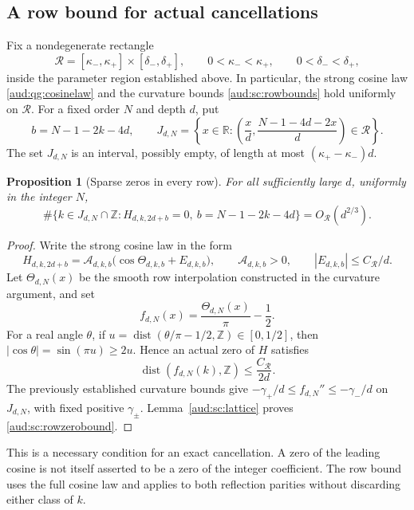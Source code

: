 \documentclass[11pt,a4paper]{article}
\numberwithin{equation}{section}
\newtheorem{proposition}[theorem]{Proposition}
\begin{document}
\subsection{A row bound for actual cancellations}\label{aud:sc:rows}
Fix a nondegenerate rectangle
\[
 \mathcal R=[\kappa_-,\kappa_+]\times[\delta_-,\delta_+],
 \qquad 0<\kappa_-<\kappa_+,
 \qquad 0<\delta_-<\delta_+,
\]
inside the parameter region established above.  In particular, the strong
cosine law \eqref{aud:qg:cosinelaw} and the curvature bounds
\eqref{aud:sc:rowbounds} hold uniformly on $\mathcal R$.
For a fixed order $N$ and depth $d$, put
\[
 b=N-1-2k-4d,
 \qquad
 J_{d,N}=\left\{x\in\mathbb R:
 \left(\frac{x}{d},\frac{N-1-4d-2x}{d}\right)\in\mathcal R\right\}.
\]
The set $J_{d,N}$ is an interval, possibly empty, of length at most
$(\kappa_+-\kappa_-)d$.

\begin{proposition}[Sparse zeros in every row]\label{aud:sc:rowzeros}
For all sufficiently large $d$, uniformly in the integer $N$,
\begin{equation}\label{aud:sc:rowzerobound}
 \#\{k\in J_{d,N}\cap\mathbb Z:
          H_{d,k,2d+b}=0,\ b=N-1-2k-4d\}
 =O_{\mathcal R}(d^{2/3}).
\end{equation}
\end{proposition}
\begin{proof}
Write the strong cosine law in the form
\[
 H_{d,k,2d+b}
 =\mathcal A_{d,k,b}\bigl(\cos\Theta_{d,k,b}+E_{d,k,b}\bigr),
 \qquad \mathcal A_{d,k,b}>0,
 \qquad |E_{d,k,b}|\le C_{\mathcal R}/d.
\]
Let $\Theta_{d,N}(x)$ be the smooth row interpolation constructed in the
curvature argument, and set
\[
 f_{d,N}(x)=\frac{\Theta_{d,N}(x)}{\pi}-\frac12.
\]
For a real angle $\theta$, if
$u=\operatorname{dist}(\theta/\pi-1/2,\mathbb Z)\in[0,1/2]$, then
$|\cos\theta|=\sin(\pi u)\ge2u$.  Hence an actual zero of $H$ satisfies
\[
 \operatorname{dist}(f_{d,N}(k),\mathbb Z)
 \le \frac{C_{\mathcal R}}{2d}.
\]
The previously established curvature bounds give
$-\gamma_+/d\le f_{d,N}''\le-\gamma_-/d$ on $J_{d,N}$, with fixed positive $\gamma_\pm$.
Lemma~\ref{aud:sc:lattice} proves \eqref{aud:sc:rowzerobound}.
\end{proof}

This is a necessary condition for an exact cancellation.  A zero of the
leading cosine is not itself asserted to be a zero of the integer
coefficient.  The row bound uses the full cosine law and applies to both
reflection parities without discarding either class of $k$.
\end{document}
